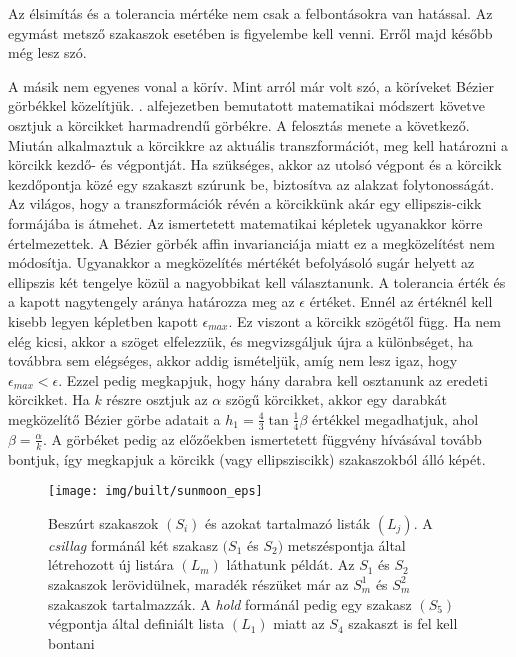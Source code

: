 \documentclass[12pt]{report}
\theoremstyle{definition}
\begin{document}
Az élsimítás és a tolerancia mértéke nem csak a felbontásokra van hatással. Az
egymást metsző szakaszok esetében is figyelembe kell venni. Erről majd később
még lesz szó.

A másik nem egyenes vonal a körív. Mint arról már volt szó, a köríveket Bézier
görbékkel közelítjük. . alfejezetben bemutatott matematikai
módszert követve osztjuk a körcikket harmadrendű görbékre. A felosztás menete a
következő. Miután alkalmaztuk a körcikkre az aktuális transzformációt, meg kell
határozni a körcikk kezdő- és végpontját. Ha szükséges, akkor az utolsó végpont
és a körcikk kezdőpontja közé egy szakaszt szúrunk be, biztosítva az alakzat
folytonosságát. Az világos, hogy a transzformációk révén a körcikkünk akár egy
ellipszis-cikk formájába is átmehet. Az ismertetett matematikai képletek
ugyanakkor körre értelmezettek. A Bézier görbék affin invarianciája miatt ez a
megközelítést nem módosítja. Ugyanakkor a megközelítés mértékét befolyásoló
sugár helyett az ellipszis két tengelye közül a nagyobbikat kell választanunk. A
tolerancia érték és a kapott nagytengely aránya határozza meg az $\epsilon$
értéket. Ennél az értéknél kell kisebb legyen  képletben kapott
$\epsilon_{max}$. Ez viszont a körcikk szögétől függ. Ha nem elég kicsi, akkor a
szöget elfelezzük, és megvizsgáljuk újra a különbséget, ha továbbra sem
elégséges, akkor addig ismételjük, amíg nem lesz igaz, hogy $\epsilon_{max} <
\epsilon$. Ezzel pedig megkapjuk, hogy hány darabra kell osztanunk az eredeti
körcikket. Ha $k$ részre osztjuk az $\alpha$ szögű körcikket, akkor egy darabkát
megközelítő Bézier görbe adatait a $h_1 = \frac{4}{3} \tan{\frac{1}{4} \beta}$
értékkel megadhatjuk, ahol $\beta = \frac{\alpha}{k}$. A görbéket pedig az
előzőekben ismertetett függvény hívásával tovább bontjuk, így megkapjuk a
körcikk (vagy ellipsziscikk) szakaszokból álló képét.

  \begin{figure}
    \centering \texttt{[image: img/built/sunmoon\_eps]}
    \caption{\label{fig:sunmoon} Beszúrt
    szakaszok $(S_i)$ és azokat tartalmazó listák $(L_j)$. A \emph{csillag}
    formánál két szakasz $(S_1$ és $S_2)$ metszéspontja által létrehozott új
    listára $(L_m)$ láthatunk példát. Az $S_1$ és $S_2$ szakaszok
    lerövidülnek, maradék részüket már az $S_m^1$ és $S_m^2$ szakaszok
    tartalmazzák. A \emph{hold} formánál pedig egy szakasz $(S_5)$
    végpontja által definiált lista $(L_1)$ miatt az $S_4$ szakaszt is fel
    kell bontani}
  \end{figure}
\end{document}
